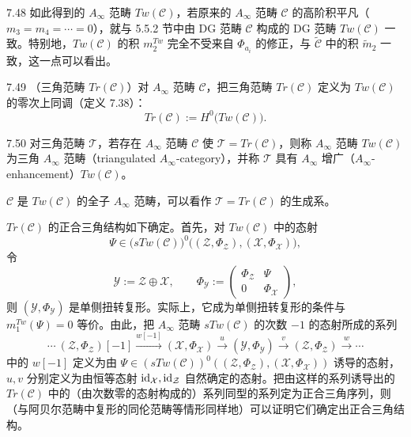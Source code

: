 \begin{remark}{7.48}
如此得到的 $A_\infty$ 范畴 $Tw(\mathcal C)$，若原来的 $A_\infty$ 范畴 $\mathcal C$ 的高阶积平凡（$m_{3}=m_{4}=\cdots=0$），就与 5.5.2 节中由 DG 范畴 $\mathcal C$ 构成的 DG 范畴 $Tw(\mathcal C)$ 一致。特别地，$Tw(\mathcal C)$ 的积 $m_{2}^{Tw}$ 完全不受来自 $\Phi_{a_{i}}$ 的修正，与 $\tilde{\mathcal C}$ 中的积 $\tilde m_{2}$ 一致，这一点可以看出。
\end{remark}

\begin{definition}{7.49}
（三角范畴 $Tr(\mathcal C)$）对 $A_\infty$ 范畴 $\mathcal C$，把三角范畴 $Tr(\mathcal C)$ 定义为 $Tw(\mathcal C)$ 的零次上同调（定义 7.38）：
\[
  Tr(\mathcal C):=H^{0}\bigl(Tw(\mathcal C)\bigr).
\]
\end{definition}

\begin{definition}{7.50}
对三角范畴 $\mathcal T$，若存在 $A_\infty$ 范畴 $\mathcal C$ 使 $\mathcal T=Tr(\mathcal C)$，则称 $A_\infty$ 范畴 $Tw(\mathcal C)$ 为三角 $A_\infty$ 范畴（triangulated $A_\infty$-category），并称 $\mathcal T$ 具有 $A_\infty$ 增广（$A_\infty$-enhancement）$Tw(\mathcal C)$。
\end{definition}

$\mathcal C$ 是 $Tw(\mathcal C)$ 的全子 $A_\infty$ 范畴，可以看作 $\mathcal T=Tr(\mathcal C)$ 的生成系。

$Tr(\mathcal C)$ 的正合三角结构如下确定。首先，对 $Tw(\mathcal C)$ 中的态射
\[
  \Psi\in\bigl(sTw(\mathcal C)\bigr)^{0}\bigl((\mathcal Z,\Phi_{\mathcal Z}),(\mathcal X,\Phi_{\mathcal X})\bigr),
\]
令
\[
  \mathcal Y:=\mathcal Z\oplus\mathcal X,\qquad
  \Phi_{\mathcal Y}:=\begin{pmatrix}\Phi_{\mathcal Z}&\Psi\\ 0&\Phi_{\mathcal X}\end{pmatrix},
\]
则 $(\mathcal Y,\Phi_{\mathcal Y})$ 是单侧扭转复形。实际上，它成为单侧扭转复形的条件与 $m_{1}^{Tw}(\Psi)=0$ 等价。由此，把 $A_\infty$ 范畴 $sTw(\mathcal C)$ 的次数 $-1$ 的态射所成的系列
\[
  \cdots\ (\mathcal Z,\Phi_{\mathcal Z})[-1]\xrightarrow{w[-1]}(\mathcal X,\Phi_{\mathcal X})\xrightarrow{u}(\mathcal Y,\Phi_{\mathcal Y})\xrightarrow{v}(\mathcal Z,\Phi_{\mathcal Z})\xrightarrow{w}\cdots
\]
中的 $w[-1]$ 定义为由 $\Psi\in(sTw(\mathcal C))^{0}((\mathcal Z,\Phi_{\mathcal Z}),(\mathcal X,\Phi_{\mathcal X}))$ 诱导的态射，$u,v$ 分别定义为由恒等态射 $\mathrm{id}_{\mathcal X},\mathrm{id}_{\mathcal Z}$ 自然确定的态射。把由这样的系列诱导出的 $Tr(\mathcal C)$ 中的（由次数零的态射构成的）系列同型的系列定为正合三角序列，则（与阿贝尔范畴中复形的同伦范畴等情形同样地）可以证明它们确定出正合三角结构。

